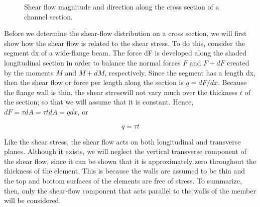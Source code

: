 \documentclass[
fontsize=10pt,
a4paper,
twosides=false,
open=any,
svgnames,
]{kaobook} %
\begin{document}
\begin{figure}[h]
  \centering
  \caption{Shear flow magnitude and direction along the cross section of a channel section.}
\end{figure}

Before we determine the shear-flow distribution on a cross section, we will first show how the shear flow is related to the shear stress. To do this, consider the segment dx of a wide-flange beam. The force dF is developed along the shaded longitudinal section in order to balance the normal forces $F$ and $F + dF$ created by the moments $M$ and $M + dM$, respectively. Since the segment has a length dx, then the shear flow or force per length along the section is $q = dF/dx$. Because the flange wall is thin, the shear stresswill not vary much over the thickness $t$ of the section; so that we will assume that it is constant. Hence, $dF = \tau dA = \tau t dA = qdx$, or 

\[q = \tau t\]

Like the shear stress, the shear flow acts on both longitudinal and transverse planes. Although it exists, we will neglect the vertical transverse component of the shear flow, since it can be shown that it is approximately zero throughout the thickness of the element. This is because the walls are assumed to be thin and the top and bottom surfaces of the elements are free of stress. To summarize, then, only the shear-flow component that acts parallel to the walls of the member will be considered.
\end{document}
